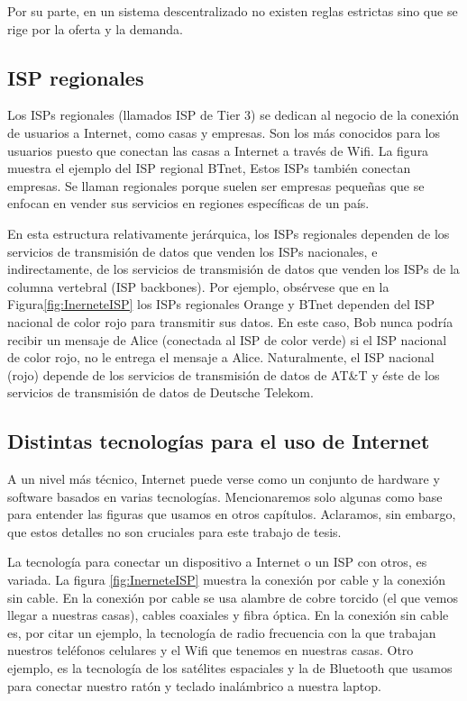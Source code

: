 \documentclass[12pt]{report} %
\begin{document}
Por su parte, en un sistema descentralizado no existen reglas estrictas sino que se rige por la oferta y la demanda.

\subsection{ISP regionales}

Los ISPs regionales (llamados ISP de Tier 3) se dedican al negocio de la conexión de usuarios a Internet, como casas y empresas.  Son los más conocidos para los usuarios puesto que conectan las casas a Internet a través de Wifi.  La figura muestra el ejemplo del ISP regional BTnet, Estos ISPs también conectan empresas. Se llaman regionales porque suelen ser empresas pequeñas que se enfocan en vender sus servicios en regiones específicas de un país.

En esta estructura relativamente jerárquica, los ISPs regionales dependen de los servicios de transmisión de datos que venden los ISPs nacionales, e indirectamente, de los servicios de transmisión de datos que venden los ISPs de la columna vertebral (ISP backbones). Por ejemplo, obsérvese que en la Figura\ref{fig:InerneteISP} los ISPs regionales Orange y BTnet dependen del ISP nacional de color rojo para transmitir sus datos. En este caso, Bob nunca podría recibir un mensaje de Alice (conectada al ISP de color verde) si el ISP nacional de color rojo, no le entrega el mensaje a Alice. Naturalmente, el ISP nacional (rojo) depende de los servicios de transmisión de datos de AT\&T y éste de los servicios de transmisión de datos de Deutsche Telekom.

\subsection{Distintas tecnologías para el uso de Internet}

A un nivel más técnico, Internet puede verse como un conjunto de hardware y software basados en varias tecnologías. Mencionaremos solo algunas como base para entender las figuras que usamos en otros capítulos. Aclaramos, sin embargo, que estos detalles no son cruciales para este trabajo de tesis.

La tecnología para conectar un dispositivo a Internet o un ISP con otros, es variada. La figura \ref{fig:InerneteISP} muestra la conexión por cable y la conexión sin cable. En la conexión por cable se usa alambre de cobre torcido (el que vemos llegar a nuestras casas), cables coaxiales y fibra óptica. En la conexión sin cable es, por citar un ejemplo, la tecnología de radio frecuencia con la que trabajan nuestros teléfonos celulares y el Wifi que tenemos en nuestras casas. Otro ejemplo, es la tecnología de los satélites espaciales y la de Bluetooth que usamos para conectar nuestro ratón y teclado inalámbrico a nuestra laptop.
\end{document}
